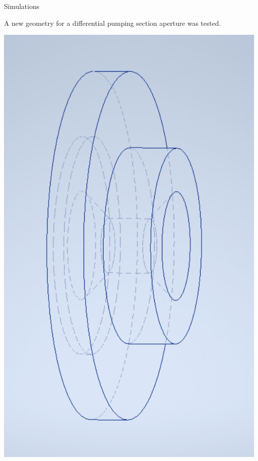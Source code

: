 \documentclass{beamer}
\begin{document}
\begin{frame}{Simulations}
    \vspace*{3em}

    \begin{center}  
        A new geometry for a differential pumping section aperture was tested.
    \end{center}

    \begin{center}  
        \includegraphics[scale=0.2]{assets/oldchamfer.pdf}

\end{center}
\end{frame}
\end{document}
